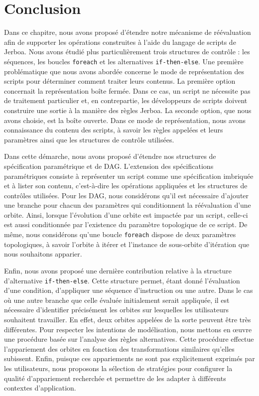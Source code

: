 \section{Conclusion}
\label{sec:reevaluation-scripts-conclusion}



Dans ce chapitre, nous avons proposé d'étendre notre mécanisme de réévaluation afin
de supporter les opérations construites à l'aide du langage de scripts de
Jerboa. %
Nous avons étudié plus particulièrement trois structures de contrôle : les séquences, les boucles \texttt{foreach} et les alternatives
\texttt{if-then-else}. %
Une première problématique que nous avons abordée concerne le mode de représentation
des scripts pour déterminer comment traiter leurs contenus. %
La première option concernait la représentation boîte fermée. %
Dans ce cas, un script ne nécessite pas de traitement particulier et, en
contrepartie, les développeurs de scripts doivent construire une sortie à la
manière des règles Jerboa. %
La seconde option, que nous avons choisie, est la boîte ouverte. %
Dans ce mode de représentation, nous avons connaissance du contenu des scripts,
à savoir les règles appelées et leurs paramètres ainsi que les structures de
contrôle utilisées. %

Dans cette démarche, nous avons proposé d'étendre nos structures de spécification
paramétrique et de DAG. %
L'extension des spécifications paramétriques consiste à représenter un script
comme une spécification imbriquée et à lister son contenu, c'est-à-dire les
opérations appliquées et les structures de contrôles utilisées. %
Pour les DAG, nous considérons qu'il est nécessaire d'ajouter une branche pour
chacun des paramètres qui conditionnent la réévaluation d'une orbite. %
Ainsi, lorsque l'évolution d'une orbite est impactée par un script, celle-ci est
aussi conditionnée par l'existence du paramètre topologique de ce script. %
De même, nous considérons qu'une boucle \texttt{foreach} dispose de deux
paramètres topologiques, à savoir l'orbite à itérer et l'instance de sous-orbite
d'itération que nous souhaitons apparier. %


Enfin, nous avons proposé une dernière contribution relative à la structure
d'alternative \texttt{if-then-else}. %
Cette structure permet, étant donné l'évaluation d'une condition, d'appliquer une
séquence d'instruction ou une autre. %
Dans le cas où une autre branche que celle évaluée initialement serait
appliquée, il est nécessaire d'identifier précisément les orbites sur lesquelles
les utilisateurs souhaitent travailler. %
En effet, deux orbites appelées de la sorte peuvent être très différentes. %
Pour respecter les intentions de modélisation, nous mettons en \oe uvre une procédure basée sur l'analyse des règles alternatives. Cette procédure effectue l'appariement des orbites en fonction des transformations similaires qu'elles subissent. %
Enfin, puisque ces appariements ne sont pas explicitement exprimés par les
utilisateurs, nous proposons la sélection de stratégies pour configurer la
qualité d'appariement recherchée et permettre de les adapter à différents
contextes d'application. %

